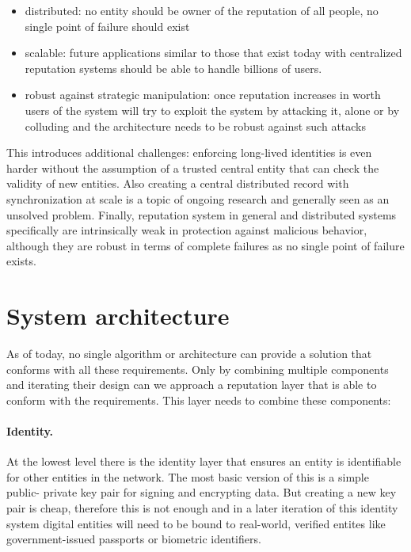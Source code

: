 
\begin{itemize}
    \item distributed: no entity should be owner of the reputation of all people, no single point of
    failure should exist
    \item scalable: future applications similar to those that exist today with centralized reputation
    systems should be able to handle billions of users.
    \item robust against strategic manipulation: once reputation increases in worth users of the 
    system will try to exploit the system by attacking it, alone or by colluding and the
    architecture needs to be robust against such attacks
\end{itemize}
  
This introduces additional challenges: enforcing long-lived identities is even harder without the 
assumption of a trusted central entity that can check the validity of new entities. Also creating
a central distributed record with synchronization at scale is a topic of ongoing research and 
generally seen as an unsolved problem. Finally, reputation system in general and distributed systems
specifically are intrinsically weak in protection against malicious behavior, although they are 
robust in terms of complete failures as no single point of failure exists.

\section{System architecture}
As of today, no single algorithm or architecture can provide a solution that conforms with all these 
requirements. Only by combining multiple components and iterating their design can we approach a 
reputation layer that is able to conform with the requirements. This layer needs to combine these
components:

\paragraph{Identity.} At the lowest level there is the identity layer that ensures an entity is 
identifiable for other entities in the network. The most basic version of this is a simple public-
private key pair for signing and encrypting data. But creating a new key pair is cheap, therefore 
this is not enough and in a later iteration of this identity system digital entities will need to be 
bound to real-world, verified entites like government-issued passports or biometric identifiers.

